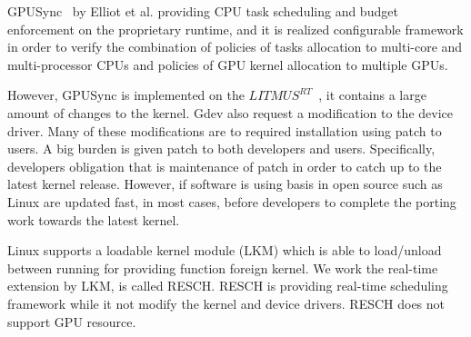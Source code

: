 GPUSync~\cite{elliott:gpusync13,elliott:explor14} by Elliot et al. providing CPU task scheduling and budget enforcement on the proprietary runtime,
and it is realized configurable framework in order to verify the combination of policies of tasks allocation to multi-core and multi-processor CPUs and policies of GPU kernel allocation to multiple GPUs.

However, GPUSync is implemented on the $LITMUS^{RT}$~\cite{litmus}, it contains a large amount of changes to the kernel.
Gdev also request a modification to the device driver.
Many of these modifications are to required installation using patch to users.
A big burden is given patch to both developers and users.
Specifically, developers obligation that is maintenance of patch in order to catch up to the latest kernel release.
However, if software is using basis in open source such as Linux are updated fast,
in most cases, before developers to complete the porting work towards the latest kernel.

Linux supports a loadable kernel module (LKM) which is able to load/unload between running for providing function foreign kernel.
We work the real-time extension by LKM, is called RESCH.
RESCH is providing real-time scheduling framework while it not modify the kernel and device drivers.
RESCH does not support GPU resource.



